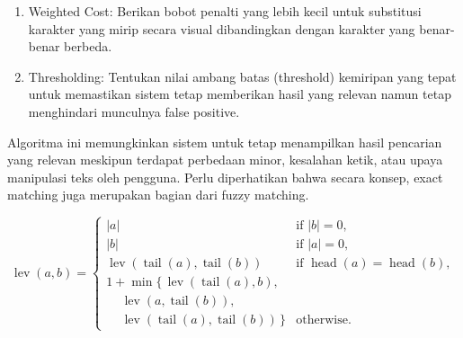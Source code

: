 \begin{enumerate}
          \begin{enumerate}
              \item Weighted Cost: Berikan bobot penalti yang lebih kecil untuk substitusi karakter yang mirip secara visual dibandingkan dengan karakter yang benar-benar berbeda.
              \item Thresholding: Tentukan nilai ambang batas (threshold) kemiripan yang tepat untuk memastikan sistem tetap memberikan hasil yang relevan namun tetap menghindari munculnya false positive.
          \end{enumerate}
          Algoritma ini memungkinkan sistem untuk tetap menampilkan hasil pencarian yang relevan meskipun terdapat perbedaan minor, kesalahan ketik, atau upaya manipulasi teks oleh pengguna. Perlu diperhatikan bahwa secara konsep, exact matching juga merupakan bagian dari fuzzy matching.

          \[
              \operatorname{lev}(a,b)=
              \begin{cases}
                  |a|                                                                          & \text{if } |b|=0,                                         \\
                  |b|                                                                          & \text{if } |a|=0,                                         \\
                  \operatorname{lev}(\operatorname{tail}(a),\operatorname{tail}(b))            & \text{if } \operatorname{head}(a)=\operatorname{head}(b), \\
                  1+\min\{\,\operatorname{lev}(\operatorname{tail}(a),b),                                                                                  \\
                  \quad\,\operatorname{lev}(a,\operatorname{tail}(b)),                                                                                     \\
                  \quad\,\operatorname{lev}(\operatorname{tail}(a),\operatorname{tail}(b))\,\} & \text{otherwise.}
              \end{cases}
          \]


\end{enumerate}
